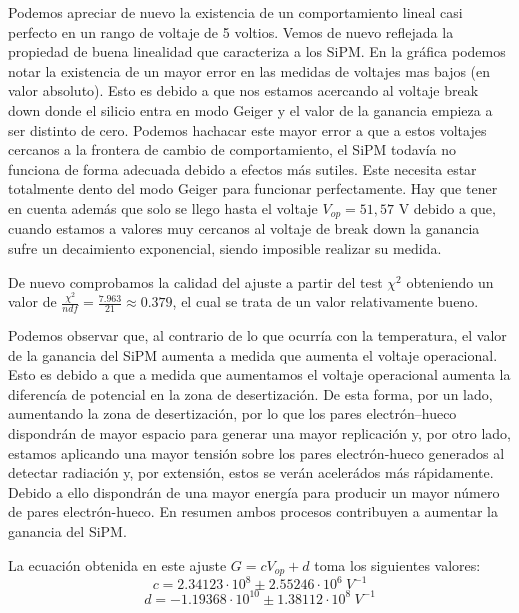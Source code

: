 \begin{itemize}
Podemos apreciar de nuevo la existencia de un comportamiento lineal casi perfecto en un rango de voltaje de 5 voltios. Vemos de nuevo reflejada la propiedad de buena linealidad que caracteriza a los SiPM. En la gráfica podemos notar la existencia de un mayor error en las medidas de voltajes mas bajos (en valor absoluto). Esto es debido a que nos estamos acercando al voltaje break down donde el silicio entra en modo Geiger y el valor de la ganancia empieza a ser distinto de cero. Podemos hachacar este mayor error a que a estos voltajes cercanos a la frontera de cambio de comportamiento, el SiPM todavía no funciona de forma adecuada debido a efectos más sutiles. Este necesita estar totalmente dento del modo Geiger para funcionar perfectamente. Hay que tener en cuenta además que solo se llego hasta el voltaje $V_{op}=51,57$ V debido a que, cuando estamos a valores muy cercanos al voltaje de break down la ganancia sufre un decaimiento exponencial, siendo imposible realizar su medida.

De nuevo comprobamos la calidad del ajuste a partir del test $\chi^2$ obteniendo un valor de $\frac{\chi^2}{ndf}=\frac{7.963}{21}\approx 0.379$, el cual se trata de un valor relativamente bueno.

Podemos observar que, al contrario de lo que ocurría con la temperatura, el valor de la ganancia del SiPM aumenta a medida que aumenta el voltaje operacional. Esto es debido a que a medida que aumentamos el voltaje operacional aumenta la diferencía de potencial en la zona de desertización. De esta forma, por un lado, aumentando la zona de desertización, por lo que los pares electrón--hueco dispondrán de mayor espacio para generar una mayor replicación y, por otro lado, estamos aplicando una mayor tensión sobre los pares electrón-hueco generados al detectar radiación y, por extensión, estos se verán acelerádos más rápidamente. Debido a ello dispondrán de una mayor energía para producir un mayor número de pares electrón-hueco. En resumen ambos procesos contribuyen a aumentar la ganancia del SiPM.

La ecuación obtenida en este ajuste $G=cV_{op}+d$ toma los siguientes valores: 
\begin{equation}
c=2.34123 \cdot 10^8 \pm 2.55246 \cdot 10^6~V^{-1}
\label{ajustependientevoltaje}
\end{equation}
\begin{equation}
d=-1.19368 \cdot 10^{10} \pm 1.38112 \cdot 10^8~V^{-1}
\label{ajusteordenadavoltaje}
\end{equation}


\end{itemize}

